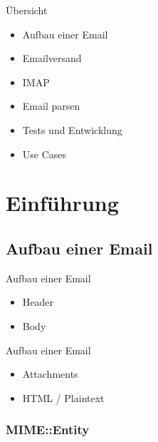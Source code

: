 \usepackage{minted}

\date{GPW 2018, Gummersbach, 5. April}


\maketitle

\begin{frame}
  \titlepage
\end{frame}

\cleardoublepage

\tableofcontents

\cleardoublepage

\begin{frame}{Übersicht}
  \begin{itemize}
  \item Aufbau einer Email
  \item Emailversand
  \item IMAP
  \item Email parsen
  \item Tests und Entwicklung
  \item Use Cases  
  \end{itemize}
\end{frame}

\section{Einführung}

\subsection{Aufbau einer Email}

\begin{frame}{Aufbau einer Email}
  \begin{itemize}
  \item Header
  \item Body
  \end{itemize}
\end{frame}

\begin{frame}{Aufbau einer Email}
  \begin{itemize}
  \item Attachments
  \item HTML / Plaintext
  \end{itemize}
\end{frame}

\subsubsection{MIME::Entity}

